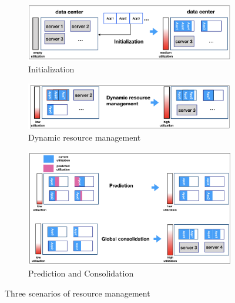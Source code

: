 \begin{figure}
	\centering
	\begin{subfigure}[b]{0.9\textwidth}
		\includegraphics[width=\textwidth]{pics/initialization.png}
		\caption{Initialization}
	\end{subfigure}
	\begin{subfigure}[b]{0.9\textwidth}
		\includegraphics[width=\textwidth]{pics/dynamic_resource.png}
	\caption{Dynamic resource management}
	\end{subfigure}
	\begin{subfigure}[b]{0.9\textwidth}
		\includegraphics[width=\textwidth]{pics/predict_consolidate.png}
	\caption{Prediction and Consolidation}
	\end{subfigure}
	\caption{Three scenarios of resource management}
	\label{fig:management}
\end{figure}

